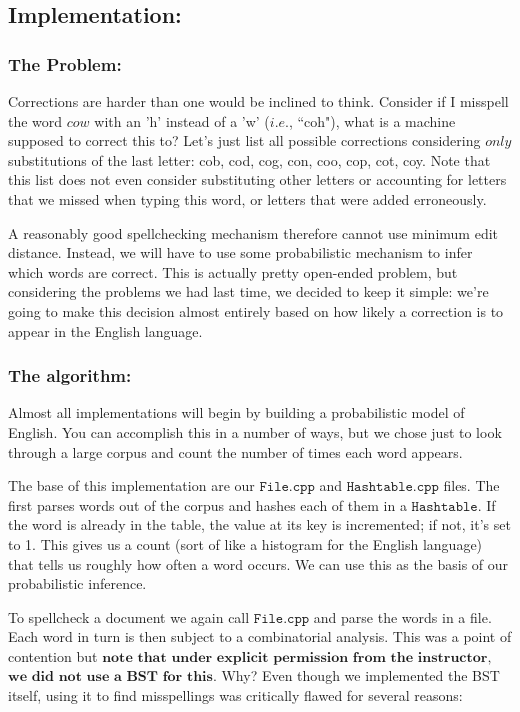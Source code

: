 \documentclass[a4paper]{article}
\begin{document}
\subsection*{Implementation:}
\subsubsection{The Problem:}

Corrections are harder than one would be inclined to think. Consider if I misspell the word $\textit{cow}$ with an 'h' instead of a 'w' ($\textit{i.e.}$, ``coh"), what is a machine supposed to correct this to? Let's just list all possible corrections considering $\textit{only}$ substitutions of the last letter: cob, cod, cog, con, coo, cop, cot, coy. Note that this list does not even consider substituting other letters or accounting for letters that we missed when typing this word, or letters that were added erroneously.

A reasonably good spellchecking mechanism therefore cannot use minimum edit distance. Instead, we will have to use some probabilistic mechanism to infer which words are correct. This is actually pretty open-ended problem, but considering the problems we had last time, we decided to keep it simple: we're going to make this decision almost entirely based on how likely a correction is to appear in the English language.

\subsubsection{The algorithm:}

Almost all implementations will begin by building a probabilistic model of English. You can accomplish this in a number of ways, but we chose just to look through a large corpus and count the number of times each word appears.

The base of this implementation are our $\texttt{File.cpp}$ and $\texttt{Hashtable.cpp}$ files. The first parses words out of the corpus and hashes each of them in a $\texttt{Hashtable}$. If the word is already in the table, the value at its key is incremented; if not, it's set to 1. This gives us a count (sort of like a histogram for the English language) that tells us roughly how often a word occurs. We can use this as the basis of our probabilistic inference.

To spellcheck a document we again call $\texttt{File.cpp}$ and parse the words in a file. Each word in turn is then subject to a combinatorial analysis. This was a point of contention but $\textbf{note that}$ $\textbf{under explicit}$ $\textbf{permission from}$ $\textbf{the instructor,}$ $\textbf{we did not}$ $\textbf{use a BST for this}$. Why? Even though we implemented the BST itself, using it to find misspellings was critically flawed for several reasons:
\end{document}

